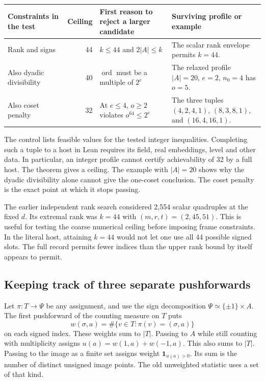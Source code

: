 \documentclass[12pt,letterpaper]{article}
\begin{document}
\begin{center}
\small
\begin{tabularx}{\linewidth}{@{}p{.22\linewidth}rYY@{}}\toprule
Constraints in the test & Ceiling & First reason to reject a larger candidate & Surviving profile or example\\\midrule
Rank and signs & 44 & $k\le44$ and $2|A|\le k$ & The scalar rank envelope permits $k=44$.\\
Also dyadic divisibility & 40 & $\operatorname{ord}$ must be a multiple of $2^e$ & The relaxed profile $|A|=20$, $e=2$, $n_0=4$ has $o=5$.\\
Also coset penalty & 32 & At $e\le4$, $o\ge2$ violates $o^{64}\le2^e$ & The three tuples $(4,2,4,1)$, $(8,3,8,1)$, and $(16,4,16,1)$.\\\bottomrule
\end{tabularx}
\end{center}

The control lists feasible values for the tested integer inequalities. Completing such a tuple to a host in Lean requires its field, real embeddings, level and other data. In particular, an integer profile cannot certify achievability of 32 by a full host. The theorem gives a ceiling. The example with $|A|=20$ shows why the dyadic divisibility alone cannot give the one-coset conclusion. The coset penalty is the exact point at which it stops passing.

The earlier independent rank search considered 2,554 scalar quadruples at the fixed $d$. Its extremal rank was $k=44$ with $(m,r,t)=(2,45,51)$. This is useful for testing the coarse numerical ceiling before imposing frame constraints. In the literal host, attaining $k=44$ would not let one use all 44 possible signed slots. The full record permits fewer indices than the upper rank bound by itself appears to permit.

\subsection{Keeping track of three separate pushforwards}
Let $\pi:T\to\Psi$ be any assignment, and use the sign decomposition $\Psi\simeq\{\pm1\}\times A$. The first pushforward of the counting measure on $T$ puts
\[
                    w(\sigma,a)=\#\{v\in T:\pi(v)=(\sigma,a)\}
\]
on each signed index. These weights sum to $|T|$. Passing to $A$ while still counting with multiplicity assigns $u(a)=w(1,a)+w(-1,a)$. This also sums to $|T|$. Passing to the image as a finite set assigns weight $\mathbf1_{u(a)>0}$. Its sum is the number of distinct unsigned image points. The old unweighted statistic uses a set of that kind.
\end{document}
